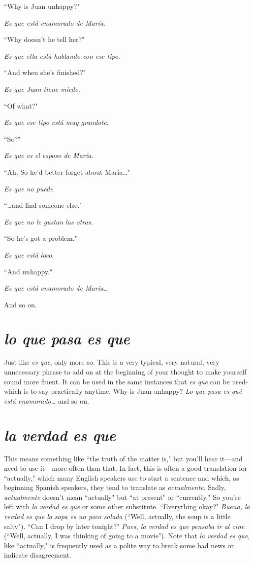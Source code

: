 \bsk

\inda ``Why is Juan unhappy?"

\indu \emph{Es que está enamorado de María}.

\inda ``Why doesn't he tell her?"

\indu \emph{Es que ella está hablando con ese tipo}.

\inda ``And when she's finished?"

\indu \emph{Es que Juan tiene miedo}.

\inda ``Of what?"

\indu \emph{Es que ese tipo está muy grandote}.

\inda ``So?"

\indu \emph{Es que es el esposo de María}.

\inda ``Ah. So he'd better forget about Maria\ldots{}"

\indu \emph{Es que no puede}.

\inda ``\ldots{}and find someone else."

\indu \emph{Es que no le gustan las otras}.

\inda ``So he's got a problem."

\indu \emph{Es que está loco}.

\inda ``And unhappy."

\indu \emph{Es que está enamorado de Maria}\ldots{}

\bsk

And so on.

\section{\emph{lo que pasa es que}}

Just like \emph{es que}, only more so. This is a very typical, very
natural, very unnecessary phrase to add on at the beginning of your
thought to make yourself sound more fluent. It can be used in the
same instances that \emph{es que} can be used-which is to say practically
anytime. Why is Juan unhappy? \emph{Lo que pasa es qué está
	enamorado}\ldots{} and so on.

\section{\emph{la verdad es que}}

This means something like ``the truth of the matter is," but
you'll hear it---and need to use it---more often than that. In fact, this is
often a good translation for ``actually," which many English speakers
use to start a sentence and which, as beginning Spanish speakers, they
tend to translate as \emph{actualmente}. Sadly, \emph{actualmente} doesn't mean
``actually" but ``at present" or ``currently." So you're left with \emph{la verdad es que} or some other substitute. ``Everything okay?" \emph{Bueno, la
	verdad es que la sopa es un poco salada} (``Well, actually, the soup is a
little salty"). ``Can I drop by later tonight?" \emph{Pues, la verdad es que pensaba ir al cine} (``Well, actually, I was thinking of going to a movie").
Note that \emph{la verdad es que}, like ``actually," is frequently used as a polite way to break some bad news or indicate disagreement.


